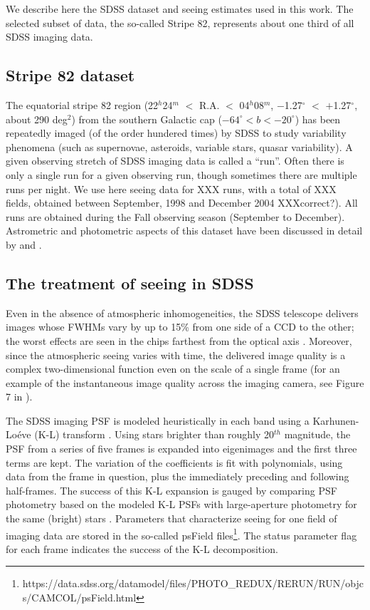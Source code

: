 

We describe here the SDSS dataset and seeing estimates used in this work. The
selected subset of data, the so-called Stripe 82, represents about one third of
all SDSS imaging data. 

\subsection{Stripe 82 dataset} 

The equatorial stripe 82 region (22$^h$24$^m$ $<$ R.A. $<$ 04$^h$08$^m$, $-$1.27$^\circ$  $<$ $+$1.27$^\circ$, about 
290 deg$^2$) from the southern Galactic cap ($-64^\circ < b <  -20^\circ$) has been repeatedly imaged (of the order
hundered times) by SDSS to study variability phenomena (such as supernovae, asteroids, variable stars, quasar 
variability). A given observing stretch of SDSS imaging data is called a ``run''. Often there is only a single
run for a given observing run, though sometimes there are multiple runs per night. We use here seeing data for 
XXX runs, with a total of XXX fields, obtained between September, 1998 and December 2004 XXXcorrect?). All
runs are obtained during the Fall observing season (September to December). Astrometric and photometric aspects 
of this dataset have been discussed in detail by \cite{Ivezic2007} and \cite{Sesar2007}. 


\subsection{The treatment of seeing in SDSS}
 
Even in the absence of atmospheric inhomogeneities, the SDSS telescope delivers images whose 
FWHMs vary by up to 15\% from one side of a CCD to the other; the worst effects are seen in 
the chips farthest from the optical axis \citep{Gunn2006}. Moreover, since the atmospheric 
seeing varies with time, the delivered image quality is a complex two-dimensional function 
even on the scale of a single frame (for an example of the instantaneous image quality across 
the imaging camera, see Figure 7 in \citealt{SDSSEDR}). 
 
The SDSS imaging PSF is modeled 
heuristically in each band using a Karhunen-Lo\'{e}ve (K-L) transform \citep{Lupton2002}. 
Using stars brighter than roughly 20$^{th}$ magnitude, the PSF from a series of five frames is expanded 
into eigenimages and the first three terms are kept. The variation of the coefficients is fit 
with polynomials, using data from the frame in question, plus the immediately preceding and following 
half-frames. The success of this K-L expansion is gauged by comparing PSF photometry based on the 
modeled K-L PSFs with large-aperture photometry for the same (bright) stars \citep{SDSSEDR}. 
Parameters that characterize seeing for one field of imaging data are stored in the so-called psField 
files\footnote{https://data.sdss.org/datamodel/files/PHOTO\_REDUX/RERUN/RUN/objcs/CAMCOL/psField.html}. 
The status parameter flag for each frame indicates the success of the K-L decomposition.

